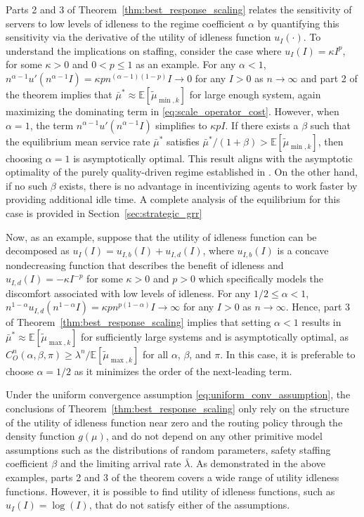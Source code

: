 \documentclass[a4paper,11pt,twoside]{article}
\numberwithin{equation}{section}
\numberwithin{figure}{section}
\theoremstyle{plain}
\newcommand{\EE}{\mathbb{E}}
\newcommand{\1}{\mathbbm{1}}
\begin{document}
Parts 2 and 3 of Theorem~\ref{thm:best_response_scaling} relates the sensitivity of servers to low levels of idleness to the regime coefficient $\alpha$ by quantifying this sensitivity via the derivative of the utility of idleness function $u_I(\cdot)$. To understand the implications on staffing, consider the case where $u_I(I)=\kappa I^p$, for some $\kappa>0$ and $0< p \leq 1$ as an example. For any $\alpha<1$, $n^{\alpha-1}u'(n^{\alpha-1}I)=\kappa p n^{(\alpha-1)(1-p)}I\to 0$ for any $I>0$ as $n\to \infty$ and part 2 of the theorem implies that $\bar{\mu}^*\approx \EE[\tilde{\mu}_{\min,k}]$ for large enough system, again maximizing the dominating term in \eqref{eq:scale_operator_cost}. However, when $\alpha = 1$, the term $n^{\alpha-1} u'(n^{\alpha-1} I)$ simplifies to $\kappa p I$. If there exists a $\beta$ such that the equilibrium mean service rate $\bar{\mu}^*$ satisfies $\bar{\mu}^* / (1+\beta) > \mathbb{E}[\tilde{\mu}_{\min,k}]$, then choosing $\alpha = 1$ is asymptotically optimal. This result aligns with the asymptotic optimality of the purely quality-driven regime established in \cite{Gopalakrishnan_etal2016}. On the other hand, if no such $\beta$ exists, there is no advantage in incentivizing agents to work faster by providing additional idle time.  A complete analysis of the equilibrium for this case is provided in Section~\ref{sec:strategic_grr}

Now, as an example, suppose that the utility of idleness function can be decomposed as $u_I(I) = u_{I,b}(I) + u_{I,d}(I)$, where $u_{I,b}(I)$ is a concave nondecreasing function that describes the benefit of idleness and $u_{I,d}(I)=-\kappa I^{-p}$ for some $\kappa>0$ and $p>0$ which specifically models  the discomfort associated with low levels of idleness. For any $1/2\leq \alpha < 1$, $n^{1-\alpha}u_{I,d}(n^{1-\alpha}I)=\kappa p n^{p(1-\alpha)} I \to \infty$ for any $I>0$ as $n\to \infty$.  Hence, part 3 of Theorem~\ref{thm:best_response_scaling} implies that setting $\alpha < 1$ results in $\bar{\mu}^* \approx \mathbb{E}[\tilde{\mu}_{\max,k}]$ for sufficiently large systems and is asymptotically optimal, as $C_O^n(\alpha, \beta, \pi) \geq \lambda^n / \mathbb{E}[\tilde{\mu}_{\max,k}]$ for all $\alpha$, $\beta$, and $\pi$. In this case, it is preferable to choose $\alpha = 1/2$ as it minimizes the order of the next-leading term.
 

Under the uniform convergence assumption \eqref{eq:uniform_conv_assumption}, the conclusions of Theorem~\ref{thm:best_response_scaling} only rely on the structure of the utility of idleness function near zero and the routing policy through the density function $g(\mu)$, and do not depend on any other primitive model assumptions such as the distributions of random parameters, safety staffing coefficient $\beta$ and the limiting arrival rate $\bar{\lambda}$. As demonstrated in the above examples, parts 2 and 3 of the theorem covers a wide range of utility idleness functions. However, it is possible to find utility of idleness functions, such as $u_I(I)=\log(I)$, that do not satisfy either of the assumptions.  
\end{document}

